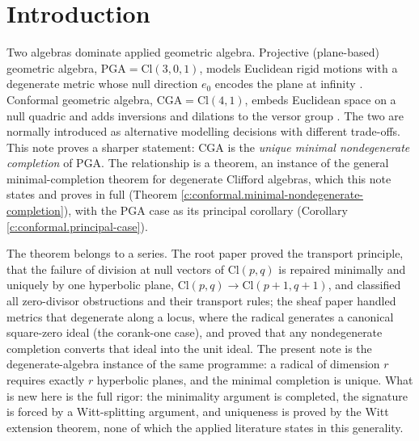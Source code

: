 \documentclass[11pt]{article}
\theoremstyle{definition}
\theoremstyle{plain}
\providecommand{\Cl}{}\renewcommand{\Cl}{\mathrm{Cl}}
\begin{document}
\noindent{}
\newpage

\section{Introduction}

\label{c:note.conformal.setting-introduction}
Two algebras dominate applied geometric algebra. Projective (plane-based) geometric algebra, $\mathrm{PGA} = \Cl(3,0,1)$, models Euclidean rigid motions with a degenerate metric whose null direction $e_0$ encodes the plane at infinity \cite{Gunn2017, Selig2005}. Conformal geometric algebra, $\mathrm{CGA} = \Cl(4,1)$, embeds Euclidean space on a null quadric and adds inversions and dilations to the versor group \cite{HLR2001, DFM2007}. The two are normally introduced as alternative modelling decisions with different trade-offs. This note proves a sharper statement: CGA is the \emph{unique minimal nondegenerate completion} of PGA. The relationship is a theorem, an instance of the general minimal-completion theorem for degenerate Clifford algebras, which this note states and proves in full (Theorem \ref{c:conformal.minimal-nondegenerate-completion}), with the PGA case as its principal corollary (Corollary \ref{c:conformal.principal-case}).

The theorem belongs to a series. The root paper \cite{ButlerT1} proved the transport principle, that the failure of division at null vectors of $\Cl(p,q)$ is repaired minimally and uniquely by one hyperbolic plane, $\Cl(p,q) \to \Cl(p{+}1,q{+}1)$, and classified all zero-divisor obstructions and their transport rules; the sheaf paper \cite{ButlerT4} handled metrics that degenerate along a locus, where the radical generates a canonical square-zero ideal (the corank-one case), and proved that any nondegenerate completion converts that ideal into the unit ideal. The present note is the degenerate-algebra instance of the same programme: a radical of dimension $r$ requires exactly $r$ hyperbolic planes, and the minimal completion is unique. What is new here is the full rigor: the minimality argument is completed, the signature is forced by a Witt-splitting argument, and uniqueness is proved by the Witt extension theorem, none of which the applied literature states in this generality.
\end{document}
